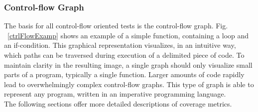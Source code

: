 	\subsubsection{Control-flow Graph}
	The basis for all control-flow oriented tests is the control-flow graph. Fig. ~\ref{ctrlFlowExamp} shows an example of a simple function, containing a loop and an if-condition. This graphical representation visualizes, in an intuitive way, which paths can be traversed during execution of a delimited piece of code. To maintain clarity in the resulting image, a single graph should only visualize small parts of a program, typically a single function. Larger amounts of code rapidly lead to overwhelmingly complex control-flow graphs. This type of graph is able to represent any program, written in an imperative programming language. \\
	
	The following sections offer more detailed descriptions of coverage metrics.
